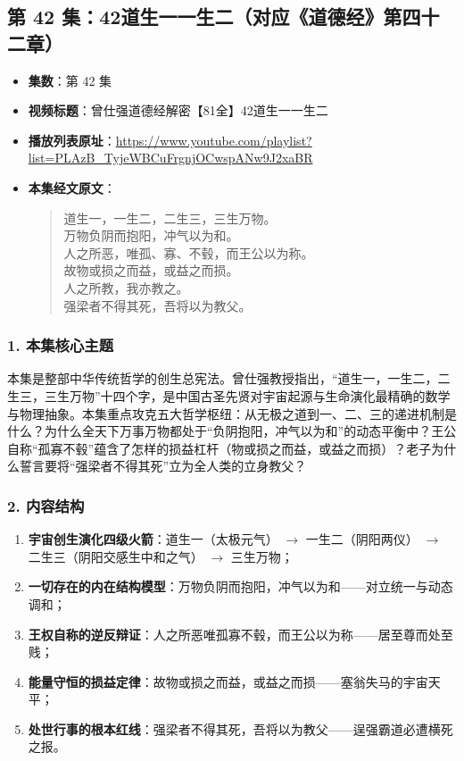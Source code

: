 \clearpage

\subsection{第 42 集：42道生一一生二（对应《道德经》第四十二章）}
\label{sec:ep42}

\begin{itemize}
    \item \textbf{集数}：第 42 集
    \item \textbf{视频标题}：曾仕强道德经解密【81全】42道生一一生二
    \item \textbf{播放列表原址}：\url{https://www.youtube.com/playlist?list=PLAzB_TyjeWBCuFrgnjOCwspANw9J2xaBR}
    \item \textbf{本集经文原文}：
    \begin{quote}\kaishu
    道生一，一生二，二生三，三生万物。\\
    万物负阴而抱阳，冲气以为和。\\
    人之所恶，唯孤、寡、不毂，而王公以为称。\\
    故物或损之而益，或益之而损。\\
    人之所教，我亦教之。\\
    强梁者不得其死，吾将以为教父。
    \end{quote}
\end{itemize}

\subsubsection{1. 本集核心主题}
本集是整部中华传统哲学的创生总宪法。曾仕强教授指出，“道生一，一生二，二生三，三生万物”十四个字，是中国古圣先贤对宇宙起源与生命演化最精确的数学与物理抽象。本集重点攻克五大哲学枢纽：从无极之道到一、二、三的递进机制是什么？为什么全天下万事万物都处于“负阴抱阳，冲气以为和”的动态平衡中？王公自称“孤寡不毂”蕴含了怎样的损益杠杆（物或损之而益，或益之而损）？老子为什么誓言要将“强梁者不得其死”立为全人类的立身教父？

\subsubsection{2. 内容结构}
\begin{enumerate}
    \item \textbf{宇宙创生演化四级火箭}：道生一（太极元气） $\rightarrow$ 一生二（阴阳两仪） $\rightarrow$ 二生三（阴阳交感生中和之气） $\rightarrow$ 三生万物；
    \item \textbf{一切存在的内在结构模型}：万物负阴而抱阳，冲气以为和——对立统一与动态调和；
    \item \textbf{王权自称的逆反辩证}：人之所恶唯孤寡不毂，而王公以为称——居至尊而处至贱；
    \item \textbf{能量守恒的损益定律}：故物或损之而益，或益之而损——塞翁失马的宇宙天平；
    \item \textbf{处世行事的根本红线}：强梁者不得其死，吾将以为教父——逞强霸道必遭横死之报。
\end{enumerate}

